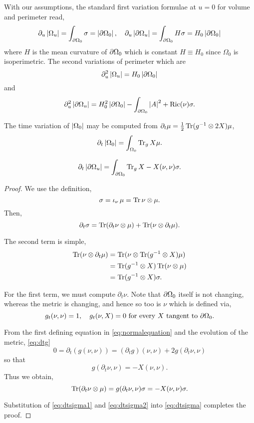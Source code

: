 \documentclass{amsart}
\begin{document}
With our assumptions, the standard first variation formulae at \(u = 0\) for volume and perimeter read,
\[
\partial_u \left|{\Omega_u}\right| = \int_{\partial {\Omega_0}} \sigma = \left|{\partial {\Omega_0}}\right|, \quad \partial_u \left|{\partial {\Omega_u}}\right| = \int_{\partial {\Omega_0}} H \sigma = H_0 \left|{\partial {\Omega_0}}\right|
\]
where \(H\) is the mean curvature of \(\partial {\Omega_0}\) which is constant \(H \equiv H_0\) since \(\Omega_0\) is isoperimetric. The second variations of perimeter which are
\[
\partial_u^2 \left|{\Omega_u}\right| = H_0 \left|{\partial {\Omega_0}}\right|
\]
and
\[
\partial_u^2 \left|{\partial {\Omega_u}}\right| = H_0^2 \left|{\partial {\Omega_0}}\right| - \int_{\partial {\Omega_0}} \left|{A}\right|^2 + \operatorname{Ric}(\nu) \sigma.
\]

The time variation of \(\left|{\Omega_0}\right|\) may be computed from \(\partial_t \mu = \tfrac{1}{2} \operatorname{Tr} (g^{-1} \otimes 2X)\mu\),
\[
\partial_t \left|{\Omega_0}\right| = \int_{\Omega_0} \operatorname{Tr}_g X \mu.
\]

\begin{lemma}
\[
\partial_t \left|{\partial {\Omega_u}}\right| = \int_{\partial {\Omega_0}} \operatorname{Tr}_g X - X(\nu, \nu) \sigma.
\]
\end{lemma}

\begin{proof}
We use the definition,
\[
\sigma = \operatorname{\iota}_{\nu} \mu = \operatorname{Tr} \nu \otimes \mu.
\]
Then,
\begin{equation}
\label{eq:dtsigma}
\partial_t \sigma = \operatorname{Tr}(\partial_t \nu \otimes \mu) + \operatorname{Tr}(\nu \otimes \partial_t \mu).
\end{equation}

The second term is simple,
\begin{equation}
\label{eq:dtsigma2}
\begin{split}
\operatorname{Tr}(\nu \otimes \partial_t \mu) &= \operatorname{Tr}(\nu \otimes \operatorname{Tr}(g^{-1} \otimes X) \mu) \\
&= \operatorname{Tr}(g^{-1} \otimes X) \operatorname{Tr} (\nu \otimes \mu) \\
&= \operatorname{Tr}(g^{-1} \otimes X) \sigma.
\end{split}
\end{equation}

For the first term, we must compute \(\partial_t \nu\). Note that \(\partial {\Omega_0}\) itself is not changing, whereas the metric is changing, and hence so too is \(\nu\) which is defined via,
\begin{equation}
\label{eq:normalequation}
g_t(\nu, \nu) = 1, \quad g_t(\nu, X) = 0 \text{ for every \(X\) tangent to \(\partial {\Omega_0}\)}.
\end{equation}

From the first defining equation in \eqref{eq:normalequation} and the evolution of the metric, \eqref{eq:dtg}
\[
0 = \partial_t (g(\nu, \nu)) = (\partial_t g) (\nu, \nu) + 2g(\partial_t \nu, \nu)
\]
so that
\[
g(\partial_t \nu, \nu) = -X(\nu, \nu).
\]
Thus we obtain,
\begin{equation}
\label{eq:dtsigma1}
\operatorname{Tr}(\partial_t \nu \otimes \mu) = g(\partial_t \nu, \nu) \sigma = -X(\nu, \nu) \sigma.
\end{equation}

Substitution of \eqref{eq:dtsigma1} and \eqref{eq:dtsigma2} into \eqref{eq:dtsigma} completes the proof.
\end{proof}
\end{document}
